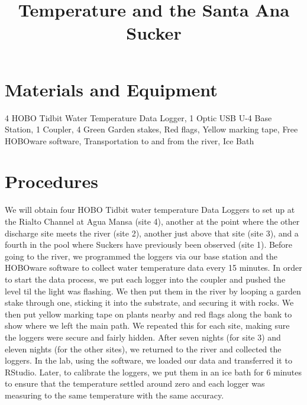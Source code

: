 \documentclass{article}
\title{Temperature and the Santa Ana Sucker}
\begin{document}

\maketitle

\section{Materials and Equipment}

4 HOBO Tidbit Water Temperature Data Logger,
1 Optic USB U-4 Base Station,
1 Coupler,
4 Green Garden stakes,
Red flags,
Yellow marking tape,
Free HOBOware software,
Transportation to and from the river,
Ice Bath

\section{Procedures}

We will obtain four HOBO Tidbit water temperature Data Loggers to set up at the Rialto Channel at Agua Mansa (site 4), another at the point where the other discharge site meets the river (site 2), another just above that site (site 3), and a fourth in the pool where Suckers have previously been observed (site 1). Before going to the river, we programmed the loggers via our base station and the HOBOware software to collect water temperature data every 15 minutes. In order to start the data process, we put each logger into the coupler and pushed the level til the light was flashing. We then put them in the river by looping a garden stake through one, sticking it into the substrate, and securing it with rocks. We then put yellow marking tape on plants nearby and red flags along the bank to show where we left the main path. We repeated this for each site, making sure the loggers were secure and fairly hidden. After seven nights (for site 3) and eleven nights (for the other sites), we returned to the river and collected the loggers. In the lab, using the software, we loaded our data and transferred it to RStudio. Later, to calibrate the loggers, we put them in an ice bath for 6 minutes to ensure that the temperature settled around zero and each logger was measuring to the same temperature with the same accuracy.
\end{document}
